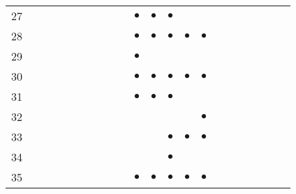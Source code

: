 \documentclass[text.tex]{subfiles}
\begin{document}
\begin{table}
\begin{tabular}{l|ccccccccccccccccccccc}
27  &           &           &           &           &           &           &           &           &           & $\bullet$ & $\bullet$ & $\bullet$ &           &           &           &           &           &           &           &           &           \\
28  &           &           &           &           &           &           &           &           &           & $\bullet$ & $\bullet$ & $\bullet$ & $\bullet$ & $\bullet$ &           &           &           &           &           &           &           \\
29  &           &           &           &           &           &           &           &           &           & $\bullet$ &           &           &           &           &           &           &           &           &           &           &           \\
30  &           &           &           &           &           &           &           &           &           & $\bullet$ & $\bullet$ & $\bullet$ & $\bullet$ & $\bullet$ &           &           &           &           &           &           &           \\
31  &           &           &           &           &           &           &           &           &           & $\bullet$ & $\bullet$ & $\bullet$ &           &           &           &           &           &           &           &           &           \\
32  &           &           &           &           &           &           &           &           &           &           &           &           &           & $\bullet$ &           &           &           &           &           &           &           \\
33  &           &           &           &           &           &           &           &           &           &           &           & $\bullet$ & $\bullet$ & $\bullet$ &           &           &           &           &           &           &           \\
34  &           &           &           &           &           &           &           &           &           &           &           & $\bullet$ &           &           &           &           &           &           &           &           &           \\
35  &           &           &           &           &           &           &           &           &           & $\bullet$ & $\bullet$ & $\bullet$ & $\bullet$ & $\bullet$ &           &           &           &           &           &           &           \\

\end{tabular}
\end{table}
\end{document}
